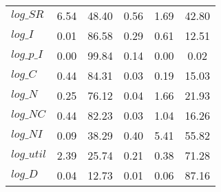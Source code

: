 \begin{center}
\begin{longtable}{lccccc}
$log\_SR    $	 & 	        6.54	 & 	       48.40	 & 	        0.56	 & 	        1.69	 & 	       42.80 \\ 
$log\_I     $	 & 	        0.01	 & 	       86.58	 & 	        0.29	 & 	        0.61	 & 	       12.51 \\ 
$log\_p\_I  $	 & 	        0.00	 & 	       99.84	 & 	        0.14	 & 	        0.00	 & 	        0.02 \\ 
$log\_C     $	 & 	        0.44	 & 	       84.31	 & 	        0.03	 & 	        0.19	 & 	       15.03 \\ 
$log\_N     $	 & 	        0.25	 & 	       76.12	 & 	        0.04	 & 	        1.66	 & 	       21.93 \\ 
$log\_NC    $	 & 	        0.44	 & 	       82.23	 & 	        0.03	 & 	        1.04	 & 	       16.26 \\ 
$log\_NI    $	 & 	        0.09	 & 	       38.29	 & 	        0.40	 & 	        5.41	 & 	       55.82 \\ 
$log\_util  $	 & 	        2.39	 & 	       25.74	 & 	        0.21	 & 	        0.38	 & 	       71.28 \\ 
$log\_D     $	 & 	        0.04	 & 	       12.73	 & 	        0.01	 & 	        0.06	 & 	       87.16 \\ 
\end{longtable}
 \end{center}
